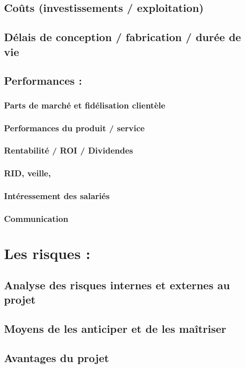 	\subsection{Coûts (investissements / exploitation)}
	\subsection{Délais de conception / fabrication / durée de vie}
	\subsection{Performances  :}
		\subsubsection{Parts de marché et fidélisation clientèle}
		\subsubsection{Performances du produit / service}
		\subsubsection{Rentabilité / ROI / Dividendes}
		\subsubsection{RID, veille,}
		\subsubsection{Intéressement des salariés}
		\subsubsection{Communication}

\section{Les risques :}
	\subsection{Analyse des risques internes et externes au projet}
	\subsection{Moyens de les anticiper et de les maîtriser}
	\subsection{Avantages du projet}

